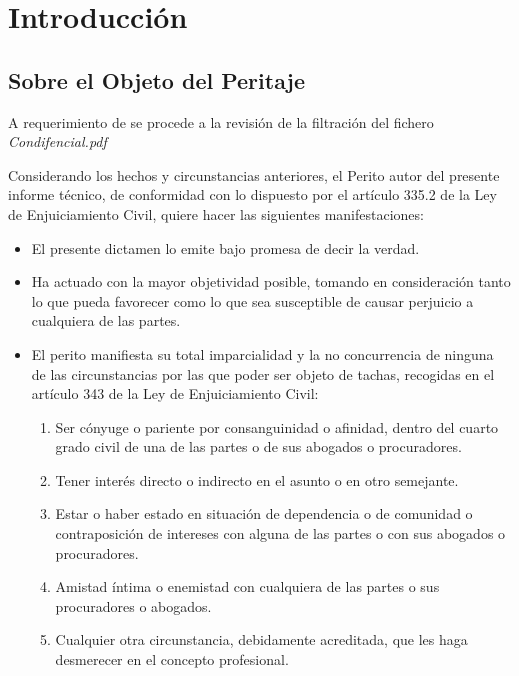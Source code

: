 \section{Introducción}

\subsection{Sobre el Objeto del Peritaje}

A requerimiento de \textbf{\Cliente} se procede a la revisión de la filtración del fichero \textit{Condifencial.pdf}

Considerando los hechos y circunstancias anteriores, el Perito autor del presente informe técnico, de conformidad con lo dispuesto por el artículo 335.2 de la Ley de Enjuiciamiento Civil, quiere hacer las siguientes manifestaciones:

\begin{itemize}[leftmargin=1.5em]
    \item El presente dictamen lo emite bajo promesa de decir la verdad.
    \item Ha actuado con la mayor objetividad posible, tomando en consideración tanto lo que pueda favorecer como lo que sea susceptible de causar perjuicio a cualquiera de las partes.
    \item El perito manifiesta su total imparcialidad y la no concurrencia de ninguna de las circunstancias por las que poder ser objeto de tachas, recogidas en el artículo 343 de la Ley de Enjuiciamiento Civil:
    \begin{enumerate}[label=\alph*), leftmargin=1.8em]
        \item Ser cónyuge o pariente por consanguinidad o afinidad, dentro del cuarto grado civil de una de las partes o de sus abogados o procuradores.
        \item Tener interés directo o indirecto en el asunto o en otro semejante.
        \item Estar o haber estado en situación de dependencia o de comunidad o contraposición de intereses con alguna de las partes o con sus abogados o procuradores.
        \item Amistad íntima o enemistad con cualquiera de las partes o sus procuradores o abogados.
        \item Cualquier otra circunstancia, debidamente acreditada, que les haga desmerecer en el concepto profesional.
    \end{enumerate}
\end{itemize}


